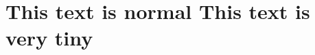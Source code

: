 \documentclass{article}
\begin{document}
\section{This text is normal { This text is very tiny}}
\end{document}
